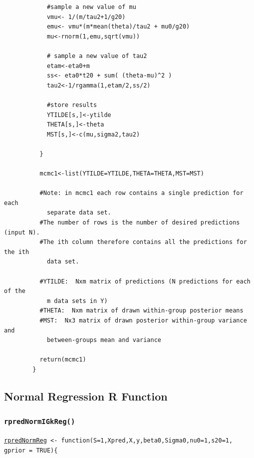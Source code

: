 \documentclass[12pt, a4paper]{article}
\begin{document}
\begin{verbatim}
            #sample a new value of mu
            vmu<- 1/(m/tau2+1/g20)
            emu<- vmu*(m*mean(theta)/tau2 + mu0/g20)
            mu<-rnorm(1,emu,sqrt(vmu))

            # sample a new value of tau2
            etam<-eta0+m
            ss<- eta0*t20 + sum( (theta-mu)^2 )
            tau2<-1/rgamma(1,etam/2,ss/2)

            #store results
            YTILDE[s,]<-ytilde
            THETA[s,]<-theta
            MST[s,]<-c(mu,sigma2,tau2)

          }

          mcmc1<-list(YTILDE=YTILDE,THETA=THETA,MST=MST)

          #Note: in mcmc1 each row contains a single prediction for each
            separate data set.
          #The number of rows is the number of desired predictions (input N).
          #The ith column therefore contains all the predictions for the ith
            data set.

          #YTILDE:  Nxm matrix of predictions (N predictions for each of the
            m data sets in Y)
          #THETA:  Nxm matrix of drawn within-group posterior means
          #MST:  Nx3 matrix of drawn posterior within-group variance and
            between-groups mean and variance

          return(mcmc1)
        }
      \end{verbatim}

  \subsection{Normal Regression R Function}

    \subsubsection{\texttt{rpredNormIGkReg()}}\label{sec:rpredNormReg}

    \texttt{\hyperref[sec:NormRegimp]{rpredNormReg} <- function(S=1,Xpred,X,y,beta0,Sigma0,nu0=1,s20=1,
          gprior = TRUE)\{ }
\end{document}
